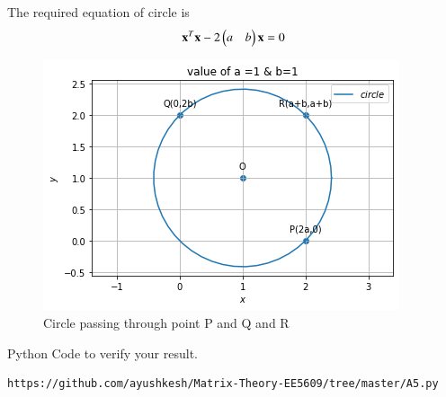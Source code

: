 \documentclass[journal,12pt,twocolumn]{IEEEtran}
\begin{document}
The required equation of circle is 
\begin{align}
\mathbf{x}^T\mathbf{x}-2\begin{pmatrix}a&b\end{pmatrix}\mathbf{x} = 0
\end{align}
\begin{figure}[!ht]
\centering
\includegraphics[width=\columnwidth]{5.png}
\caption{Circle passing through point P and Q and R}
\label{Fig:5}
\end{figure}
Python Code to verify your result.
\begin{lstlisting}
https://github.com/ayushkesh/Matrix-Theory-EE5609/tree/master/A5.py
\end{lstlisting}
\end{document}
